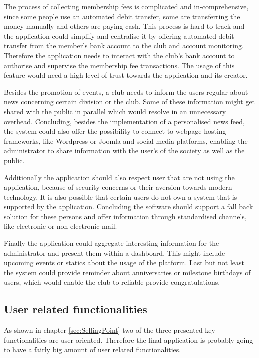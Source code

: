 The process of collecting membership fees is complicated and in-comprehensive, since some people use an automated debit transfer, some are transferring the money manually and others are paying cash. This process is hard to track and the application could simplify and centralise it by offering automated debit transfer from the member's bank account to the club and account monitoring. Therefore the application needs to interact with the club's bank account to authorise and supervise the membership fee transactions. The usage of this feature would need a high level of trust towards the application and its creator.

Besides the promotion of events, a club needs to inform the users regular about news concerning certain division or the club. Some of these information might get shared with the public in parallel which would resolve in an unnecessary overhead. Concluding, besides the implementation of a personalised news feed, the system could also offer the possibility to connect to webpage hosting frameworks, like Wordpress or Joomla and social media platforms, enabling the administrator to share information with the user's of the society as well as the public.

Additionally the application should also respect user that are not using the application, because of security concerns or their aversion towards modern technology. It is also possible that certain users do not own a system that is supported by the application. Concluding the software should support a fall back solution for these persons and offer information through standardised channels, like electronic or non-electronic mail.

Finally the application could aggregate interesting information for the administrator and present them within a dashboard. This might include upcoming events or statics about the usage of the platform. Last but not least the system could provide reminder about anniversaries or milestone birthdays of users, which would enable the club to reliable provide congratulations.

\subsection{User related functionalities}

As shown in chapter \vref{sec:SellingPoint} two of the three presented key functionalities are user oriented. Therefore the final application is probably going to have a fairly big amount of user related functionalities.

